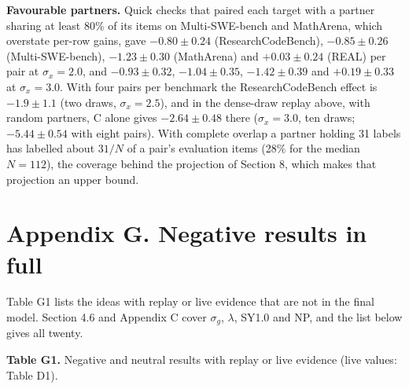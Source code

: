 \documentclass[
]{article}
\begin{document}
\textbf{Favourable partners.} Quick checks that paired each target with
a partner sharing at least 80\% of its items on Multi-SWE-bench and
MathArena, which overstate per-row gains, gave \(-0.80 \pm 0.24\)
(ResearchCodeBench), \(-0.85 \pm
0.26\) (Multi-SWE-bench), \(-1.23 \pm 0.30\) (MathArena) and
\(+0.03 \pm 0.24\) (REAL) per pair at \(\sigma_x = 2.0\), and
\(-0.93 \pm 0.32\), \(-1.04 \pm 0.35\), \(-1.42 \pm 0.39\) and
\(+0.19 \pm 0.33\) at \(\sigma_x = 3.0\). With four pairs per benchmark
the ResearchCodeBench effect is \(-1.9 \pm 1.1\) (two draws,
\(\sigma_x = 2.5\)), and in the dense-draw replay above, with random
partners, C alone gives \(-2.64 \pm 0.48\) there (\(\sigma_x = 3.0\),
ten draws; \(-5.44 \pm 0.54\) with eight pairs). With complete overlap a
partner holding 31 labels has labelled about \(31/N\) of a pair's
evaluation items (28\% for the median \(N = 112\)), the coverage behind
the projection of Section 8, which makes that projection an upper bound.

\section{Appendix G. Negative results in
full}\label{appendix-g.-negative-results-in-full}

Table G1 lists the ideas with replay or live evidence that are not in
the final model. Section 4.6 and Appendix C cover \(\sigma_g\),
\(\lambda\), SY1.0 and NP, and the list below gives all twenty.

\textbf{Table G1.} Negative and neutral results with replay or live
evidence (live values: Table D1).
\end{document}
